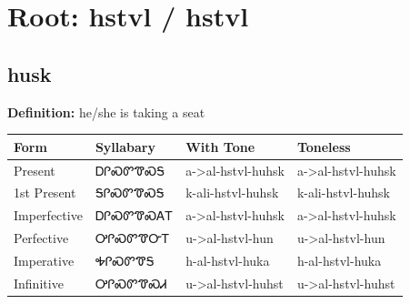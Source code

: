 \documentclass{article}%
\begin{document}
%
\normalsize%
\section*{Root: hstvl / hstvl}%
\subsection*{husk}%
\textbf{Definition: }%
he/she is taking a seat%
\\[0.5em]%
\begin{tabular}{|l|l|l|l|}%
\hline%
\textbf{Form}&\textbf{Syllabary}&\textbf{With Tone}&\textbf{Toneless}\\%
\hline%
Present&ᎠᎵᏍᏛᏡᏍᎦ&a{-}>al{-}hstvl{-}huhsk&a{-}>al{-}hstvl{-}huhsk\\%
1st Present&ᎦᎵᏍᏛᏡᏍᎦ&k{-}ali{-}hstvl{-}huhsk&k{-}ali{-}hstvl{-}huhsk\\%
Imperfective&ᎠᎵᏍᏛᏡᏍᎪᎢ&a{-}>al{-}hstvl{-}huhsk&a{-}>al{-}hstvl{-}huhsk\\%
Perfective&ᎤᎵᏍᏛᏡᏅᎢ&u{-}>al{-}hstvl{-}hun&u{-}>al{-}hstvl{-}hun\\%
Imperative&ᎭᎵᏍᏛᏡᎦ&h{-}al{-}hstvl{-}huka&h{-}al{-}hstvl{-}huka\\%
Infinitive&ᎤᎵᏍᏛᏡᏍᏗ&u{-}>al{-}hstvl{-}huhst&u{-}>al{-}hstvl{-}huhst\\%
\hline%
\end{tabular}%
\\[1em]%
\end{document}
